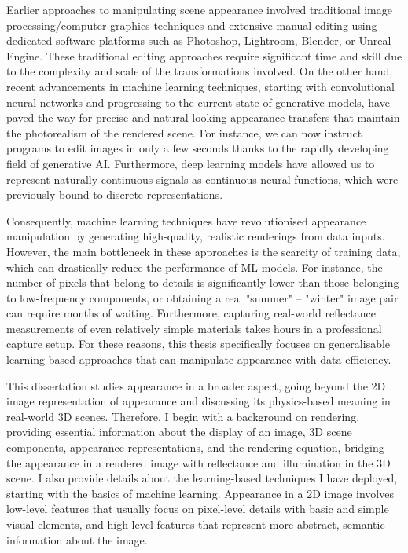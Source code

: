 Earlier approaches to manipulating scene appearance involved traditional image processing/computer graphics techniques and extensive manual editing using dedicated software platforms such as Photoshop, Lightroom, Blender, or Unreal Engine. These traditional editing approaches require significant time and skill due to the complexity and scale of the transformations involved. On the other hand, recent advancements in machine learning techniques, starting with convolutional neural networks and progressing to the current state of generative models, have paved the way for precise and natural-looking appearance transfers that maintain the photorealism of the rendered scene. For instance, we can now instruct programs to edit images in only a few seconds thanks to the rapidly developing field of generative AI. Furthermore, deep learning models have allowed us to represent naturally continuous signals as continuous neural functions, which were previously bound to discrete representations.

Consequently, machine learning techniques have revolutionised appearance manipulation by generating high-quality, realistic renderings from data inputs. However, the main bottleneck in these approaches is the scarcity of training data, which can drastically reduce the performance of ML models. For instance, the number of pixels that belong to details is significantly lower than those belonging to low-frequency components, or obtaining a real "summer" – "winter" image pair can require months of waiting. Furthermore, capturing real-world reflectance measurements of even relatively simple materials takes hours in a professional capture setup. For these reasons, this thesis specifically focuses on generalisable learning-based approaches that can manipulate appearance with data efficiency.

This dissertation studies appearance in a broader aspect, going beyond the 2D image representation of appearance and discussing its physics-based meaning in real-world 3D scenes. Therefore, I begin with a background on rendering, providing essential information about the display of an image, 3D scene components, appearance representations, and the rendering equation, bridging the appearance in a rendered image with reflectance and illumination in the 3D scene. I also provide details about the learning-based techniques I have deployed, starting with the basics of machine learning. Appearance in a 2D image involves low-level features that usually focus on pixel-level details with basic and simple visual elements, and high-level features that represent more abstract, semantic information about the image.

